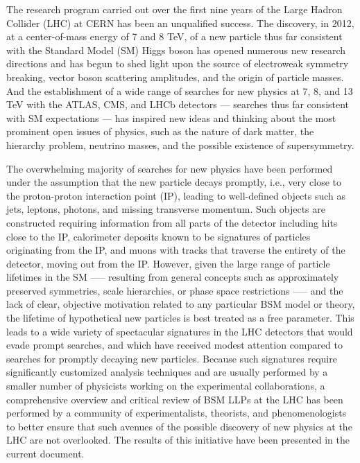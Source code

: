 The research program carried out over the first nine years of the Large Hadron Collider (LHC) at CERN has been an unqualified success.
The discovery, in 2012, at a center-of-mass energy of 7 and 8 TeV, of a new particle thus far consistent with the Standard Model (SM) Higgs boson has opened numerous new research directions and has begun to shed light upon the source of electroweak symmetry breaking, vector boson scattering amplitudes, and the origin of particle masses.
And the establishment of a wide range of searches for new physics at 7, 8, and 13 TeV with the ATLAS, CMS, and LHCb detectors — searches thus far consistent with SM expectations — has inspired new ideas and thinking about the most prominent open issues of physics, such as the nature of dark matter, the hierarchy problem, neutrino masses, and the possible existence of supersymmetry.

The overwhelming majority of searches for new physics have been performed under the assumption that the new particle decays promptly, i.e., very close to the proton-proton interaction point (IP), leading to well-defined objects such as jets, leptons, photons, and missing transverse momentum.
Such objects are constructed requiring information from all parts of the detector including hits close to the IP, calorimeter deposits known to be signatures of particles originating from the IP, and muons with tracks that traverse the entirety of the detector, moving out from the IP.
However, given the large range of particle lifetimes in the SM —-- resulting from general concepts such as approximately preserved symmetries, scale hierarchies, or phase space restrictions —-- and the lack of clear, objective motivation related to any particular BSM model or theory, the lifetime of hypothetical new particles is best treated as a free parameter.
This leads to a wide variety of spectacular signatures in the LHC detectors that would evade prompt searches, and which have received modest attention compared to searches for promptly decaying new particles.
Because such signatures require significantly customized analysis techniques and are usually performed by a smaller number of physicists working on the experimental collaborations, a comprehensive overview and critical review of BSM LLPs at the LHC has been performed by a community of experimentalists, theorists, and phenomenologists to better ensure that such avenues of the possible discovery of new physics at the LHC are not overlooked.
The results of this initiative have been presented in the current document.

